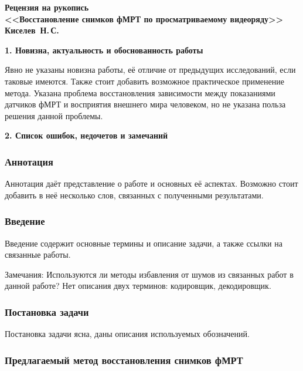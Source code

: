 \documentclass[12pt, a4paper]{extarticle}
\begin{document}

\begin{center}
    \textsf{\textbf{
        Рецензия на рукопись\\
        <<Восстановление снимков фМРТ по просматриваемому видеоряду>>\\
        Киселев~Н.\,С.
    }}
\end{center}

\begin{center}
    \textbf{1. Новизна, актуальность и обоснованность работы}
\end{center}

Явно не указаны новизна работы, её отличие от предыдущих исследований, если таковые имеются. Также стоит добавить возможное практическое применение метода. Указана проблема восстановления зависимости между показаниями датчиков фМРТ и восприятия внешнего мира человеком, но не указана польза решения данной проблемы.

\begin{center}
    \textbf{2. Список ошибок, недочетов и замечаний}
\end{center}

\subsubsection*{Аннотация}

Аннотация даёт представление о работе и основных её аспектах. Возможно стоит добавить в неё несколько слов, связанных с полученными результатами.

\subsubsection*{Введение}

Введение содержит основные термины и описание задачи, а также ссылки на связанные работы.

Замечания: Используются ли методы избавления от шумов из связанных работ в данной работе? Нет описания двух терминов: кодировщик, декодировщик.

\subsubsection*{Постановка задачи}

Постановка задачи ясна, даны описания используемых обозначений.

\subsubsection*{Предлагаемый метод восстановления снимков фМРТ}
\end{document}
